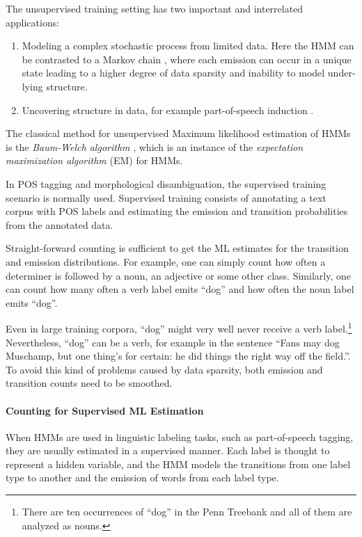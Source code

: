 The unsupervised training setting has two important and
interrelated applications:
\begin{enumerate}
\item Modeling a complex stochastic process from limited data. Here
  the HMM can be contrasted to a Markov chain \citep[318--320]{Manning1999}, where
  each emission can occur in a unique state leading to a higher degree
  of data sparsity and inability to model under-lying structure.
\item Uncovering structure in data, for example part-of-speech
  induction \citep{Johnson2007}.
\end{enumerate}
The classical method for unsupervised Maximum likelihood estimation of
HMMs is the {\it Baum-Welch algorithm} \citep{Rabiner1989}, which is
an instance of the {\it expectation maximization algorithm} (EM)
\citep{Dempster1977} for HMMs.

In POS tagging and morphological disambiguation, the supervised
training scenario is normally used. Supervised training consists of
annotating a text corpus with POS labels and estimating the emission
and transition probabilities from the annotated data. 

Straight-forward counting is sufficient to get the ML estimates for
the transition and emission distributions. For example, one can simply
count how often a determiner is followed by a noun, an adjective or
some other class. Similarly, one can count how many often a verb label
emits ``dog'' and how often the noun label emits ``dog''. 

Even in large training corpora, ``dog'' might very well never receive
a verb label.\footnote{There are ten occurrences of ``dog'' in the Penn
  Treebank and all of them are analyzed as nouns.} Nevertheless,
``dog'' can be a verb, for example in the sentence ``Fans may dog
Muschamp, but one thing's for certain: he did things the right way off
the field.''. To avoid this kind of problems caused by data sparsity,
both emission and transition counts need to be smoothed.

\paragraph{Counting for Supervised ML Estimation}
When HMMs are used in linguistic labeling tasks, such as
part-of-speech tagging, they are usually estimated in a supervised
manner. Each label is thought to represent a hidden variable, and the
HMM models the transitions from one label type to another and the
emission of words from each label type. 

